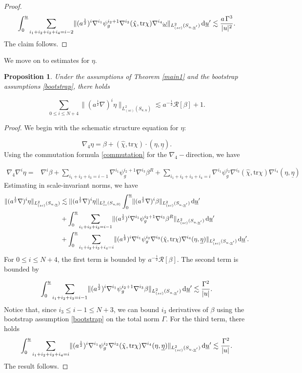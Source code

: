 \documentclass{amsart}
\newtheorem{proposition}{Proposition}[section]
\newcommand{\aln}{(\al \nabla)^i}
\newcommand{\tbeta}{\beta^R}
\newcommand{\hsp}{\hspace{.5mm}}
\newcommand{\omegabar}{\underline{\omega}}
\newcommand{\dubarprime}{\hspace{.5mm} \text{d} \ubar^{\prime}}
\newcommand{\intubar}{\int_0^{\ubar}}
\newcommand{\chihat}{\hat{\chi}}
\newcommand{\al}{a^{\frac{1}{2}}}
\newcommand{\ubar}{\underline{u}}
\newcommand{\sumitm}{\sum_{i_1+i_2+i_3=i-1}}
\newcommand{\sumif}{\sum_{i_1+i_2+i_3+i_4=i}}
\newcommand{\sumifim}{\sum_{i_1+i_2+i_3+i_4=i-2}}
\newcommand{\scaletwoSu}[1]{\lVert{#1} \rVert_{L^2_{(sc)}(S_{u,\ubar})}}
\newcommand{\scaletwoSuubarprime}[1]{\lVert{#1} \rVert_{L^2_{(sc)}(S_{u,\ubar^\prime})}}
\newcommand{\etabar}{\underline{\eta}}
\newcommand{\tr}{\mbox{tr}}
\begin{document}
{\begin{proof}
\begin{equation}
    \intubar\sumifim \scaletwoSuubarprime{(\al)^i\nabla^{i_1}\psi_g^{i_2+1}\nabla^{i_3}(\chihat,\tr\chi)\nabla^{i_4}\omegabar}\dubarprime \lesssim \frac{a\hsp \Gamma^3}{\lvert u \rvert^2}.
\end{equation}
The claim follows.
\end{proof}
\noindent We move on to estimates for $\eta$.
\begin{proposition}\label{etabound}
Under the assumptions of Theorem \ref{main1} and the bootstrap assumptions \eqref{bootstrap}, there holds

\[ \sum_{0\leq i \leq N+4} \scaletwoSu{\aln\eta}\lesssim a^{-\frac{1}{2}}\mathcal{R}[\beta]+1.\]
\end{proposition}
\begin{proof}
We begin with the schematic structure equation for $\eta$:

\[ \nabla_4 \eta = \beta + (\chihat,\tr\chi)\cdot(\eta,\etabar).\] Using the commutation formula \ref{commutation} for the $\nabla_4-$direction, we have

\begin{equation}
    \begin{split}
        \nabla_4\nabla^i \eta = &\nabla^i\beta + \sum_{i_1+i_2+i_3=i-1}\nabla^{i_1}\psi_g^{i_2+1}\nabla^{i_3}\tbeta +\sumif \nabla^{i_1}\psi_g^{i_2}\nabla^{i_3}(\chihat,\tr\chi)\nabla^{i_4}(\eta,\etabar)
    \end{split}
\end{equation}Estimating in scale-invariant norms, we have 
\begin{equation}
    \begin{split}
    \scaletwoSu{\aln\eta} &\lesssim ||(a^{\frac{1}{2}}\nabla)^{i}\eta||_{L^{2}_{sc}(S_{u,0)}} \intubar \scaletwoSuubarprime{\aln \beta} \dubarprime \\&+\intubar \sumitm \scaletwoSuubarprime{(\al)^i\nabla^{i_1}\psi_g^{i_2+1}\nabla^{i_3}\tbeta}\dubarprime \\&+\intubar \sumif \scaletwoSuubarprime{(\al)^i\nabla^{i_1}\psi_g^{i_2}\nabla^{i_3}(\chihat,\tr\chi)\nabla^{i_4}(\eta,\etabar) }\dubarprime.
    \end{split}
\end{equation}For $0\leq i \leq N+4$, the first term is bounded by $a^{-\frac{1}{2}}\mathcal{R}[\beta]$. The second term is bounded by

\begin{equation}
    \begin{split}
        \intubar \sumitm \scaletwoSuubarprime{(\al)^i\nabla^{i_1}\psi_g^{i_2+1}\nabla^{i_3}\beta}\dubarprime \lesssim \frac{\Gamma^2}{\lvert u\rvert}.
    \end{split}
\end{equation}Notice that, since $i_3\leq i-1\leq N+3$, we can bound $i_3$ derivatives of $\beta$ using the bootstrap assumption \eqref{bootstrap} on the total norm $\Gamma$. For the third term, there holds
\[ \intubar \sumif \scaletwoSuubarprime{(\al)^i\nabla^{i_1}\psi_g^{i_2}\nabla^{i_3}(\chihat,\tr\chi)\nabla^{i_4}(\eta,\etabar) }\dubarprime \lesssim \frac{\hsp \Gamma^2}{\lvert u \rvert}. \]The result follows.
\end{proof}

}
\end{document}
